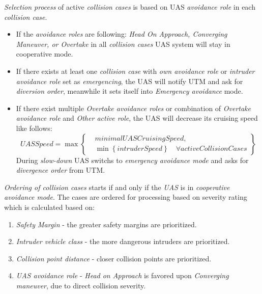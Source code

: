     \emph{Selection process} of active \emph{collision cases} is based on UAS \emph{avoidance role} in each \emph{collision case}.
    \begin{itemize}
        \item If the \emph{avoidance roles} are following: \emph{Head On Approach, Converging Maneuver, or Overtake} in all \emph{collision cases} UAS system will stay in cooperative mode.
        \item If there exists at least one \emph{collision case} with \emph{own avoidance role} or \emph{intruder avoidance role} set as \emph{emergencing}, the UAS will notify UTM and ask for \emph{diversion order}, meanwhile it sets itself into \emph{Emergency avoidance} mode.
        \item If there exist multiple \emph{Overtake avoidance roles} or combination of \emph{Overtake avoidance role} and \emph{Other active role}, the UAS will decrease its cruising speed like follows:
        \begin{equation}
            UASSpeed = \max \left\{\begin{aligned}
            & minimalUASCruisingSpeed,\\
            &\min \left\{intruderSpeed\right\}\quad \forall activeCollisionCases
            \end{aligned}
            \right\}
        \end{equation}
        During \emph{slow-down} UAS switchs to \emph{emergency avoidance mode} and asks for \emph{divergence order} from UTM.
    \end{itemize}
    
    \emph{Ordering of collision cases} starts if and only if the \emph{UAS} is in \emph{cooperative avoidance mode}. The cases are ordered for processing based on severity rating which is calculated based on:
    \begin{enumerate}
        \item \emph{Safety Margin} - the greater safety margins are prioritized.
        \item \emph{Intruder vehicle class} - the more dangerous intruders are prioritized.
        \item \emph{Collision point distance} - closer collision points are prioritized.
        \item \emph{UAS avoidance role} - \emph{Head on Approach} is favored upon \emph{Converging maneuver}, due to direct collision severity.
    \end{enumerate}
    
